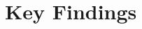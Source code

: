 \documentclass[aspectratio=169,professionalfonts]{beamer}
\begin{document}
\section{Key Findings}


\end{document}
